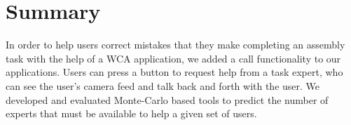 \section{Summary}

In order to help users correct mistakes that they make completing an assembly
task with the help of a WCA application, we added a call functionality to our
applications.
Users can press a button to request help from a task expert, who can see the
user's camera feed and talk back and forth with the user.
We developed and evaluated Monte-Carlo based tools to predict the number of
experts that must be available to help a given set of users.
